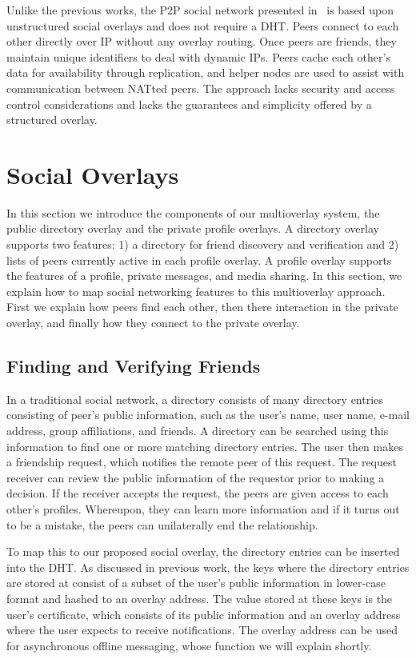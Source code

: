 \documentclass[letterpaper,twocolumn,10pt]{article}
\begin{document}
Unlike the previous works, the P2P social network presented in~\cite{tribler-osn}
is based upon unstructured social overlays and does not require a DHT.  Peers
connect to each other directly over IP without any overlay routing. Once peers
are friends, they maintain unique identifiers to deal with dynamic IPs.  Peers
cache each other's data for availability through replication, and helper nodes
are used to assist with communication between NATted peers.  The approach lacks
security and access control considerations and lacks the guarantees and
simplicity offered by a structured overlay.

\section{Social Overlays}
\label{social_overlays}
In this section we introduce the components of our multioverlay system,
the public directory overlay and the private profile overlays.  A directory
overlay supports two features:  1) a directory for friend discovery and
verification and 2) lists of peers currently active in each profile overlay.
A profile overlay supports the features of a profile, private messages, and
media sharing.  In this section, we explain how to map social networking
features to this multioverlay approach.  First we explain how peers find
each other, then there interaction in the private overlay, and finally how
they connect to the private overlay.

\subsection{Finding and Verifying Friends}
In a traditional social network, a directory consists of many directory entries
consisting of peer's public information, such as the user's name, user name,
e-mail address, group affiliations, and friends.  A directory can be searched
using this information to find one or more matching directory entries.  The user
then makes a friendship request, which notifies the remote peer of this request.
The request receiver can review the public information of the requestor prior to
making a decision.  If the receiver accepts the request, the peers are given
access to each other's profiles.  Whereupon, they can learn more information
and if it turns out to be a mistake, the peers can unilaterally end the
relationship.

To map this to our proposed social overlay, the directory entries can be
inserted into the DHT.  As discussed in previous work, the keys where the
directory entries are stored at consist of a subset of the user's public
information in lower-case format and hashed to an overlay  address.  The value
stored at these keys is the user's certificate, which consists of its public
information and an overlay address where the user expects to receive
notifications.  The overlay address can be used for asynchronous offline
messaging, whose function we will explain shortly.
\end{document}
